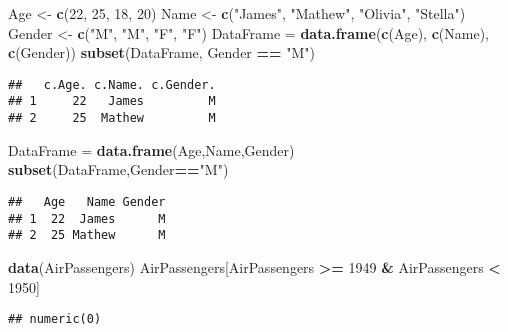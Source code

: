 \documentclass[]{article}
\newenvironment{Shaded}{\begin{snugshade}}{\end{snugshade}}
\newcommand{\KeywordTok}[1]{\textcolor[rgb]{0.13,0.29,0.53}{\textbf{#1}}}
\newcommand{\DecValTok}[1]{\textcolor[rgb]{0.00,0.00,0.81}{#1}}
\newcommand{\StringTok}[1]{\textcolor[rgb]{0.31,0.60,0.02}{#1}}
\newcommand{\OperatorTok}[1]{\textcolor[rgb]{0.81,0.36,0.00}{\textbf{#1}}}
\newcommand{\NormalTok}[1]{#1}
\begin{document}
\begin{Shaded}
\begin{Highlighting}[]
\NormalTok{Age <-}\StringTok{ }\KeywordTok{c}\NormalTok{(}\DecValTok{22}\NormalTok{, }\DecValTok{25}\NormalTok{, }\DecValTok{18}\NormalTok{, }\DecValTok{20}\NormalTok{)}
\NormalTok{Name <-}\StringTok{ }\KeywordTok{c}\NormalTok{(}\StringTok{"James"}\NormalTok{, }\StringTok{"Mathew"}\NormalTok{, }\StringTok{"Olivia"}\NormalTok{, }\StringTok{"Stella"}\NormalTok{)}
\NormalTok{Gender <-}\StringTok{ }\KeywordTok{c}\NormalTok{(}\StringTok{"M"}\NormalTok{, }\StringTok{"M"}\NormalTok{, }\StringTok{"F"}\NormalTok{, }\StringTok{"F"}\NormalTok{)}
\NormalTok{DataFrame =}\StringTok{ }\KeywordTok{data.frame}\NormalTok{(}\KeywordTok{c}\NormalTok{(Age), }\KeywordTok{c}\NormalTok{(Name), }\KeywordTok{c}\NormalTok{(Gender))}
\KeywordTok{subset}\NormalTok{(DataFrame, Gender }\OperatorTok{==}\StringTok{ "M"}\NormalTok{)}
\end{Highlighting}
\end{Shaded}

\begin{verbatim}
##   c.Age. c.Name. c.Gender.
## 1     22   James         M
## 2     25  Mathew         M
\end{verbatim}

\begin{Shaded}
\begin{Highlighting}[]
\NormalTok{DataFrame =}\StringTok{ }\KeywordTok{data.frame}\NormalTok{(Age,Name,Gender)}
\KeywordTok{subset}\NormalTok{(DataFrame,Gender}\OperatorTok{==}\StringTok{"M"}\NormalTok{)}
\end{Highlighting}
\end{Shaded}

\begin{verbatim}
##   Age   Name Gender
## 1  22  James      M
## 2  25 Mathew      M
\end{verbatim}

\begin{Shaded}
\begin{Highlighting}[]
\KeywordTok{data}\NormalTok{(AirPassengers)}
\NormalTok{AirPassengers[AirPassengers }\OperatorTok{>=}\StringTok{ }\DecValTok{1949} \OperatorTok{&}\StringTok{ }\NormalTok{AirPassengers }\OperatorTok{<}\StringTok{ }\DecValTok{1950}\NormalTok{]}
\end{Highlighting}
\end{Shaded}

\begin{verbatim}
## numeric(0)
\end{verbatim}
\end{document}
